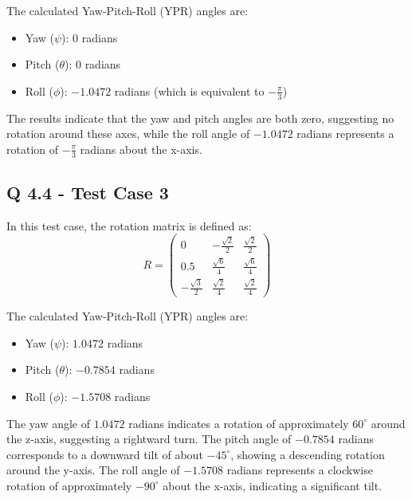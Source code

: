 The calculated Yaw-Pitch-Roll (YPR) angles are:
\begin{itemize}
    \item Yaw (\(\psi\)): \(0\) radians
    \item Pitch (\(\theta\)): \(0\) radians
    \item Roll (\(\phi\)): \(-1.0472\) radians (which is equivalent to \(-\frac{\pi}{3}\))
\end{itemize}

The results indicate that the yaw and pitch angles are both zero, suggesting no rotation around these axes, while the roll angle of \(-1.0472\) radians represents a rotation of \(-\frac{\pi}{3}\) radians about the x-axis.

\subsection{Q 4.4 - Test Case 3}

In this test case, the rotation matrix is defined as:
\[
R = \begin{pmatrix}
0 & -\frac{\sqrt{2}}{2} & \frac{\sqrt{2}}{2} \\
0.5 & \frac{\sqrt{6}}{4} & \frac{\sqrt{6}}{4} \\
-\frac{\sqrt{3}}{2} & \frac{\sqrt{2}}{4} & \frac{\sqrt{2}}{4}
\end{pmatrix}
\]

The calculated Yaw-Pitch-Roll (YPR) angles are:
\begin{itemize}
    \item Yaw (\(\psi\)): \(1.0472\) radians
    \item Pitch (\(\theta\)): \(-0.7854\) radians
    \item Roll (\(\phi\)): \(-1.5708\) radians
\end{itemize}

The yaw angle of \(1.0472\) radians indicates a rotation of approximately \(60^\circ\) around the z-axis, suggesting a rightward turn. The pitch angle of \(-0.7854\) radians corresponds to a downward tilt of about \(-45^\circ\), showing a descending rotation around the y-axis. The roll angle of \(-1.5708\) radians represents a clockwise rotation of approximately \(-90^\circ\) about the x-axis, indicating a significant tilt.
